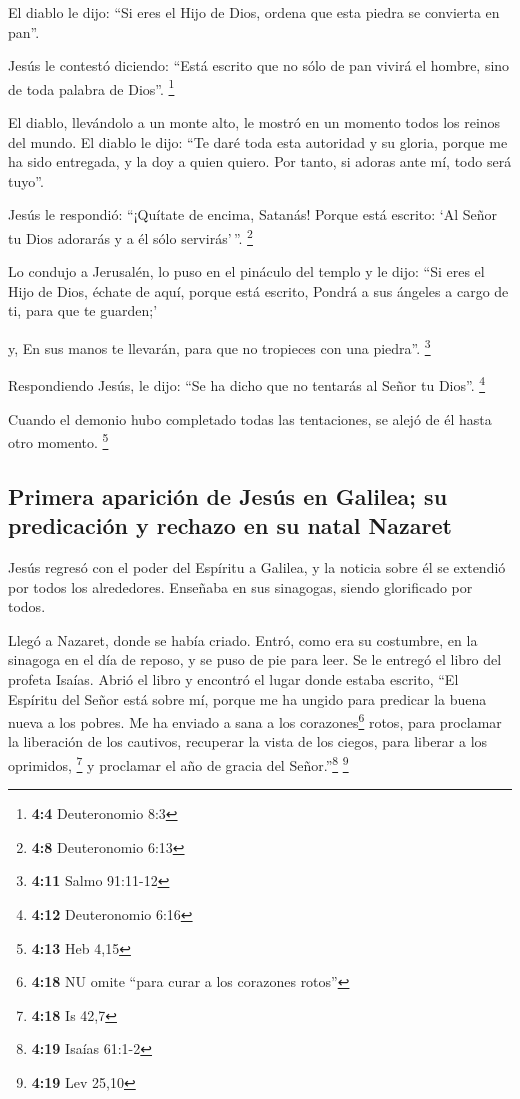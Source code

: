  El diablo le dijo: ``Si eres el Hijo de Dios, ordena que
esta piedra se convierta en pan''.

 Jesús le contestó diciendo: ``Está escrito que no sólo de
pan vivirá el hombre, sino de toda palabra de Dios''. \footnote{\textbf{4:4}
  Deuteronomio 8:3}

 El diablo, llevándolo a un monte alto, le mostró en un
momento todos los reinos del mundo.  El diablo le dijo:
``Te daré toda esta autoridad y su gloria, porque me ha sido entregada,
y la doy a quien quiero.  Por tanto, si adoras ante mí,
todo será tuyo''.

 Jesús le respondió: ``¡Quítate de encima, Satanás! Porque
está escrito: `Al Señor tu Dios adorarás y a él sólo servirás'\,''.
\footnote{\textbf{4:8} Deuteronomio 6:13}

 Lo condujo a Jerusalén, lo puso en el pináculo del templo
y le dijo: ``Si eres el Hijo de Dios, échate de aquí, 
porque está escrito, Pondrá a sus ángeles a cargo de ti, para que te
guarden;'

 y, En sus manos te llevarán, para que no tropieces con
una piedra''. \footnote{\textbf{4:11} Salmo 91:11-12}

 Respondiendo Jesús, le dijo: ``Se ha dicho que no
tentarás al Señor tu Dios''. \footnote{\textbf{4:12} Deuteronomio 6:16}

 Cuando el demonio hubo completado todas las tentaciones,
se alejó de él hasta otro momento. \footnote{\textbf{4:13} Heb 4,15}

\hypertarget{primera-apariciuxf3n-de-jesuxfas-en-galilea-su-predicaciuxf3n-y-rechazo-en-su-natal-nazaret}{%
\subsection{Primera aparición de Jesús en Galilea; su predicación y
rechazo en su natal
Nazaret}\label{primera-apariciuxf3n-de-jesuxfas-en-galilea-su-predicaciuxf3n-y-rechazo-en-su-natal-nazaret}}

 Jesús regresó con el poder del Espíritu a Galilea, y la
noticia sobre él se extendió por todos los alrededores. 
Enseñaba en sus sinagogas, siendo glorificado por todos.

 Llegó a Nazaret, donde se había criado. Entró, como era
su costumbre, en la sinagoga en el día de reposo, y se puso de pie para
leer.  Se le entregó el libro del profeta Isaías. Abrió
el libro y encontró el lugar donde estaba escrito,  ``El
Espíritu del Señor está sobre mí, porque me ha ungido para predicar la
buena nueva a los pobres. Me ha enviado a sana a los
corazones\footnote{\textbf{4:18} NU omite ``para curar a los corazones
  rotos''} rotos, para proclamar la liberación de los cautivos,
recuperar la vista de los ciegos, para liberar a los oprimidos,
\footnote{\textbf{4:18} Is 42,7}  y proclamar el año de
gracia del Señor.''\footnote{\textbf{4:19} Isaías 61:1-2} \footnote{\textbf{4:19}
  Lev 25,10}

